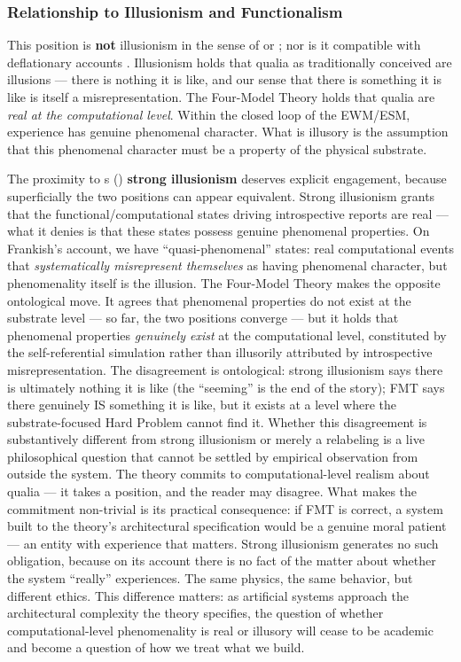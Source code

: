 \documentclass[12pt]{article}
\begin{document}
\subsubsection{Relationship to Illusionism and Functionalism}


This position is \textbf{not} illusionism in the sense of \citet{Dennett1991} or \citet{Frankish2016}; nor is it compatible with deflationary accounts \citep{Graziano2024}. Illusionism holds that qualia as traditionally conceived are illusions --- there is nothing it is like, and our sense that there is something it is like is itself a misrepresentation. The Four-Model Theory holds that qualia are \emph{real at the computational level}. Within the closed loop of the EWM/ESM, experience has genuine phenomenal character. What is illusory is the assumption that this phenomenal character must be a property of the physical substrate.

The proximity to \citeauthor{Frankish2016}\textquotesingle s (\citeyear{Frankish2016}) \textbf{strong illusionism} deserves explicit engagement, because superficially the two positions can appear equivalent. Strong illusionism grants that the functional/computational states driving introspective reports are real --- what it denies is that these states possess genuine phenomenal properties. On Frankish's account, we have ``quasi-phenomenal'' states: real computational events that \emph{systematically misrepresent themselves} as having phenomenal character, but phenomenality itself is the illusion. The Four-Model Theory makes the opposite ontological move. It agrees that phenomenal properties do not exist at the substrate level --- so far, the two positions converge --- but it holds that phenomenal properties \emph{genuinely exist} at the computational level, constituted by the self-referential simulation rather than illusorily attributed by introspective misrepresentation. The disagreement is ontological: strong illusionism says there is ultimately nothing it is like (the ``seeming'' is the end of the story); FMT says there genuinely IS something it is like, but it exists at a level where the substrate-focused Hard Problem cannot find it. Whether this disagreement is substantively different from strong illusionism or merely a relabeling is a live philosophical question that cannot be settled by empirical observation from outside the system. The theory commits to computational-level realism about qualia --- it takes a position, and the reader may disagree. What makes the commitment non-trivial is its practical consequence: if FMT is correct, a system built to the theory's architectural specification would be a genuine moral patient --- an entity with experience that matters. Strong illusionism generates no such obligation, because on its account there is no fact of the matter about whether the system ``really'' experiences. The same physics, the same behavior, but different ethics. This difference matters: as artificial systems approach the architectural complexity the theory specifies, the question of whether computational-level phenomenality is real or illusory will cease to be academic and become a question of how we treat what we build.
\end{document}
